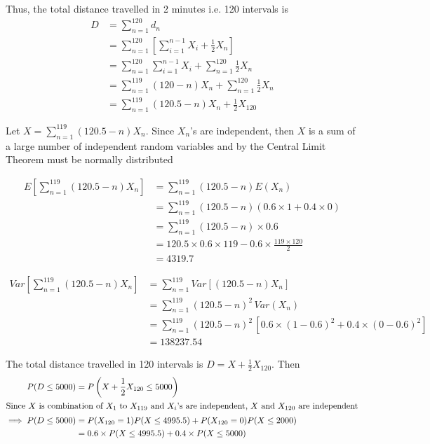 \documentclass[12pt, oneside]{article}
\begin{document}
\begin{enumerate}
{    Thus, the total distance travelled in 2 minutes i.e. 120 intervals is
    \begin{align*}
        D &= \sum_{n = 1}^{120} d_n \\
          &= \sum_{n = 1}^{120} \left[\sum_{i=1}^{n-1} X_i + \frac{1}{2} X_n\right] \\
          &= \sum_{n = 1}^{120} \sum_{i=1}^{n-1} X_i + \sum_{n = 1}^{120} \frac{1}{2} X_n \\
          &= \sum_{n = 1}^{119} (120 - n) X_n + \sum_{n = 1}^{120} \frac{1}{2} X_n 
                          \tag*{(Expanding the double summation)} \\   
          &= \sum_{n = 1}^{119} (120.5 - n) X_n + \frac{1}{2}X_{120}
    \end{align*}

    Let \(X = \sum_{n = 1}^{119} (120.5 - n) X_n\). Since \(X_n\)'s are independent,
    then \(X\) is a sum of a large number of independent random variables and by the
    Central Limit Theorem must be normally distributed

    \begin{align*}
        E\left[\sum_{n = 1}^{119} (120.5 - n) X_n\right] &= \sum_{n = 1}^{119} (120.5 - n) E(X_n) \\
            &= \sum_{n = 1}^{119} (120.5 - n) (0.6 \times 1 + 0.4 \times 0) \\
            &= \sum_{n = 1}^{119} (120.5 - n) \times 0.6 \\
            &= 120.5 \times 0.6 \times 119 - 0.6 \times \frac{119 \times 120}{2} \\
            &= 4319.7
    \end{align*}

    \begin{align*}
        Var\left[\sum_{n = 1}^{119} (120.5 - n) X_n\right]
            &= \sum_{n = 1}^{119} Var\left[(120.5 - n) X_n\right] \tag*{(As the rv's are independent)} \\
            &= \sum_{n = 1}^{119} (120.5 - n)^2 \, Var(X_n) \\
            &= \sum_{n = 1}^{119} (120.5 - n)^2 \, [0.6 \times (1 - 0.6)^2 + 0.4 \times (0 - 0.6)^2] \\
            &= 138237.54
    \end{align*}

    The total distance travelled in 120 intervals is \(D = X + \frac{1}{2} X_{120}\). Then 
    \begin{align*}
        P(D \leq 5000) &= P\left(X + \frac{1}{2} X_{120} \leq 5000\right) \\
        \intertext{Since \(X\) is combination of \(X_1\) to \(X_{119}\) and \(X_{i}\)'s 
                    are independent, \(X\) and \(X_{120}\) are independent}
        \implies P(D \leq 5000) &= P(X_{120} = 1) P(X \leq 4995.5) + P(X_{120} = 0) P(X \leq 2000) \\
            &= 0.6 \times P(X \leq 4995.5) + 0.4 \times P(X \leq 5000)
    \end{align*}

}
\end{enumerate}
\end{document}
